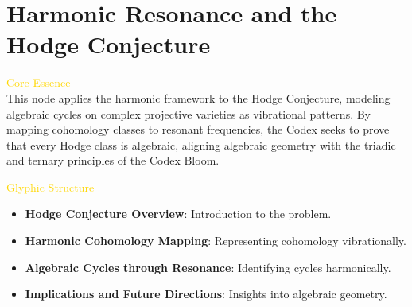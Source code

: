 
\section{Harmonic Resonance and the Hodge Conjecture}
\label{sec:codex_hodge_conjecture}



\textcolor{gold}{ Core Essence } \\
This node applies the harmonic framework to the Hodge Conjecture, modeling algebraic cycles on complex projective varieties as vibrational patterns. By mapping cohomology classes to resonant frequencies, the Codex seeks to prove that every Hodge class is algebraic, aligning algebraic geometry with the triadic and ternary principles of the Codex Bloom.

\textcolor{gold}{ Glyphic Structure } \\
\begin{itemize}
    \item \texttt{} \textbf{Hodge Conjecture Overview}: Introduction to the problem.
    \item \texttt{} \textbf{Harmonic Cohomology Mapping}: Representing cohomology vibrationally.
    \item \texttt{} \textbf{Algebraic Cycles through Resonance}: Identifying cycles harmonically.
    \item \texttt{} \textbf{Implications and Future Directions}: Insights into algebraic geometry.
\end{itemize}


